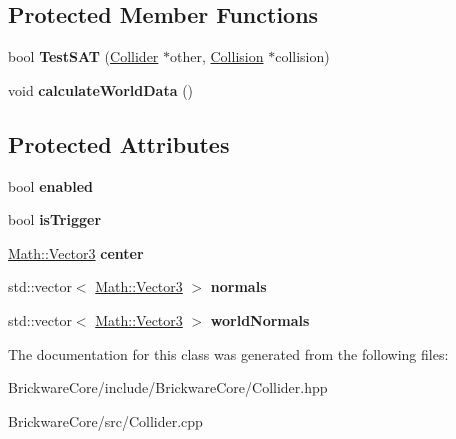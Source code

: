 \subsection*{Protected Member Functions}
\begin{DoxyCompactItemize}
\item 
\hypertarget{classBrickware_1_1Core_1_1Collider_a6fbb9af3bb7904a7053b06014c8ace2b}{}bool {\bfseries Test\+S\+A\+T} (\hyperlink{classBrickware_1_1Core_1_1Collider}{Collider} $\ast$other, \hyperlink{classBrickware_1_1Core_1_1Collision}{Collision} $\ast$collision)\label{classBrickware_1_1Core_1_1Collider_a6fbb9af3bb7904a7053b06014c8ace2b}

\item 
\hypertarget{classBrickware_1_1Core_1_1Collider_a3ac41effb6c5eb68962ed52240f18a5e}{}void {\bfseries calculate\+World\+Data} ()\label{classBrickware_1_1Core_1_1Collider_a3ac41effb6c5eb68962ed52240f18a5e}

\end{DoxyCompactItemize}
\subsection*{Protected Attributes}
\begin{DoxyCompactItemize}
\item 
\hypertarget{classBrickware_1_1Core_1_1Collider_a58168dd595ea997e08c2d456fc6d036b}{}bool {\bfseries enabled}\label{classBrickware_1_1Core_1_1Collider_a58168dd595ea997e08c2d456fc6d036b}

\item 
\hypertarget{classBrickware_1_1Core_1_1Collider_a25d8ace80c0da27c28d4b886ad9c491a}{}bool {\bfseries is\+Trigger}\label{classBrickware_1_1Core_1_1Collider_a25d8ace80c0da27c28d4b886ad9c491a}

\item 
\hypertarget{classBrickware_1_1Core_1_1Collider_a6eb0692efaa4e30d163907ae2f54ebb6}{}\hyperlink{classBrickware_1_1Math_1_1Vector3}{Math\+::\+Vector3} {\bfseries center}\label{classBrickware_1_1Core_1_1Collider_a6eb0692efaa4e30d163907ae2f54ebb6}

\item 
\hypertarget{classBrickware_1_1Core_1_1Collider_a22bab8c9a63d00bbfbd07d558eab9663}{}std\+::vector$<$ \hyperlink{classBrickware_1_1Math_1_1Vector3}{Math\+::\+Vector3} $>$ {\bfseries normals}\label{classBrickware_1_1Core_1_1Collider_a22bab8c9a63d00bbfbd07d558eab9663}

\item 
\hypertarget{classBrickware_1_1Core_1_1Collider_acf457733dfe90a9e58fd5141fa1e9d08}{}std\+::vector$<$ \hyperlink{classBrickware_1_1Math_1_1Vector3}{Math\+::\+Vector3} $>$ {\bfseries world\+Normals}\label{classBrickware_1_1Core_1_1Collider_acf457733dfe90a9e58fd5141fa1e9d08}

\end{DoxyCompactItemize}


The documentation for this class was generated from the following files\+:\begin{DoxyCompactItemize}
\item 
Brickware\+Core/include/\+Brickware\+Core/Collider.\+hpp\item 
Brickware\+Core/src/Collider.\+cpp\end{DoxyCompactItemize}
